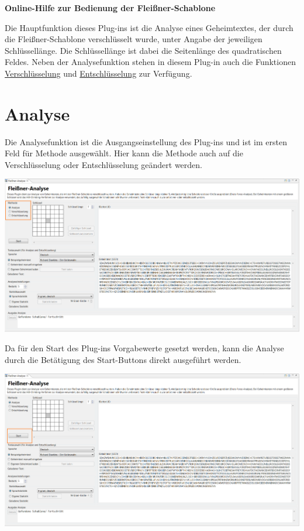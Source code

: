 \documentclass[fontsize=12pt, DIV=15, parskip=half-]{scrartcl}
\theoremstyle{break}
\begin{document}
\begin{center}
\Large\bfseries\sffamily Online-Hilfe zur Bedienung der Fleißner-Schablone  \\[0.1\baselineskip]
\normalsize\normalfont 
\end{center}
\vspace*{0.5\baselineskip}


\tableofcontents
\newpage

Die Hauptfunktion dieses Plug-ins ist die Analyse eines Geheimtextes, der durch die Fleißner-Schablone verschlüsselt wurde, unter Angabe der jeweiligen Schlüssellänge. Die Schlüssellänge ist dabei die Seitenlänge des quadratischen Feldes. 
Neben der Analysefunktion stehen in diesem Plug-in auch die Funktionen \hyperlink{verschl}{Verschlüsselung} und \hyperlink{entschl}{Entschlüsselung} zur Verfügung.


\section{Analyse}
Die Analysefunktion ist die Ausgangseinstellung des Plug-ins und ist im ersten Feld für \glqq Methode\grqq{} ausgewählt. Hier kann die Methode auch auf die Verschlüsselung oder Entschlüsselung geändert werden.

\includegraphics[scale=0.45]{FleissnerMethods.png}

Da für den Start des Plug-ins Vorgabewerte gesetzt werden, kann die Analyse durch die Betätigung des \glqq Start\grqq{}-Buttons direkt ausgeführt werden. 

\includegraphics[scale=0.45]{FleissnerStart.png}
\end{document}
